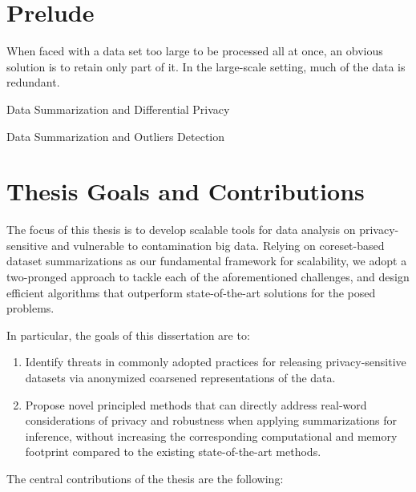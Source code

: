\section{Prelude}
\label{sec:prelude}

When faced with a data set too large to be processed all at once, an obvious solution is to retain only part of it.  In the large-scale setting, much of the data is redundant.

\par{Data Summarization and Differential Privacy}

\par{Data Summarization and Outliers Detection}

\section{Thesis Goals and Contributions}
\label{sec:thesis-goals}

The focus of this thesis is to develop scalable tools for data analysis on privacy-sensitive and vulnerable to contamination big data. Relying on coreset-based dataset summarizations as our fundamental framework for scalability, we adopt a two-pronged approach to tackle each of the aforementioned challenges, and design efficient algorithms that outperform state-of-the-art solutions for the posed problems. 

In particular, the goals of this dissertation are to:

\begin{enumerate}
	\item Identify threats in commonly adopted practices for releasing privacy-sensitive datasets via anonymized coarsened representations of the data.
	\item Propose novel principled methods that can directly address real-word considerations of privacy and robustness when applying summarizations for inference, without increasing the corresponding computational and memory footprint compared to the existing state-of-the-art methods.
\end{enumerate}

The central contributions of the thesis are the following:

